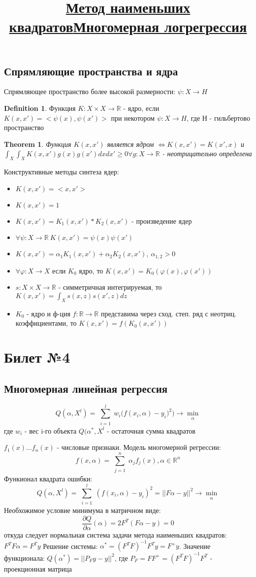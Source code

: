 \documentclass[a4paper]{article}
\theoremstyle{plain}
\newtheorem{theorem}{Theorem}
\theoremstyle{remark}
\theoremstyle{definition}
\newtheorem{definition}{Definition}
\newcommand{\setR}{\mathbb{R}}
\renewcommand{\geq}{\geqslant}
\newcommand{\bigtitle}[1]{\title{\textbf{\underline{#1}}}}
\begin{document}
\subsection{Спрямляющие пространства и ядра}
Спрямляющее пространство более высокой размерности: $\psi: X \rightarrow H$
\begin{definition}
Функция $K: X \times X \rightarrow \setR$ - ядро, если $K(x,x')=<\psi(x),\psi(x')>$ при некотором $\psi: X \rightarrow H$, где Н - гильбертово пространство
\end{definition}
\begin{theorem}
Функция $K(x,x')$ является ядром $\iff K(x,x')=K(x',x)$ и $\int_X \int_X K(x,x')g(x)g(x')dxdx' \geq 0 \forall g:X \rightarrow \setR$ - неотрицательно определена
\end{theorem}
Конструктивные методы синтеза ядер:
\begin{itemize}
	\item $K(x,x')=<x,x'>$
	\item $K(x,x')=1$
	\item $K(x,x')=K_1(x,x')*K_2(x,x')$ - произведение ядер
	\item $\forall \psi: X \rightarrow \setR \ K(x,x')=\psi(x) \psi(x')$
	\item $K(x,x') = \alpha_1 K_1(x,x') + \alpha_2 K_2(x,x'), \ \alpha_{1,2} >0$
	\item $\forall \varphi: X \rightarrow X$ если $K_0$ ядро, то $K(x,x')=K_0(\varphi(x),\varphi(x'))$
	\item $s: X \times X \rightarrow \setR$ - симметричная интегрируемая, то $K(x,x') = \int_X s(x,z)s(x',z)dz$
	\item $K_0$ - ядро и ф-ция $f: \setR \rightarrow \setR$ представима через сход. степ. ряд с неотриц. коэффициентами, то $K(x,x')=f(K_0(x,x'))$
\end{itemize}

\section{Билет №4}
\subsection{Многомерная линейная регрессия}
\bigtitle{Метод наименьших квадратов}
$$ Q(\alpha, X^l) = \sum_{\substack{i=1}}^l w_i \Big( f(x_i, \alpha) - y_i)^2 \Big) \rightarrow \min_{\substack{\alpha}} $$
где $w_i$ - вес i-го объекта
$Q(\alpha^*, X^l$ - остаточная сумма квадратов
\bigtitle{Многомерная логрегрессия}
$f_1(x) \ldots f_n(x)$ - числовые признаки. Модель многомерной регрессии:
$$f(x, \alpha) = \sum_{\substack{j=1}}^n \alpha_j f_j(x), \alpha \in \setR^n$$
Функионал квадрата ошибки:
$$ Q(\alpha, X^l) = \sum_{\substack{i=1}}^l (f(x_i, \alpha) - y_i)^2 = ||F\alpha - y ||^2 \rightarrow \min_{\substack{\alpha}} $$
Необхожимое условие минимума в матричном виде: $$ \frac{\partial Q}{\partial \alpha}(\alpha) = 2F^T(F\alpha-y) = 0 $$
откуда следует нормальная система задачи метода наименьших квадратов: $F^TF\alpha = F^Ty$
Решение системы: $\alpha^* = (F^TF)^{-1}F^Ty = F^{+}y$. Значение функционала: $Q(\alpha^*) = ||P_Fy -y ||^2$, где $P_F = FF^+ = (F^TF)^{-1}F^T$ - проекционная матрица
\end{document}
